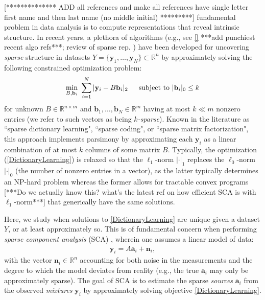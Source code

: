 \documentclass[journal, onecolumn]{IEEEtran}
\begin{document}
[************** ADD all references and make all references have single letter first name and then last name (no middle initial) *********]
 fundamental problem in data analysis is to compute representations that reveal intrinsic structure. In recent years, a plethora of algorithms (e.g., see \ref{} ***add punchiest recent algo refs***; review of sparse rep. \cite{Zhang15}) have been developed for uncovering \emph{sparse} structure in datasets $Y = \{\mathbf{y}_1, \ldots, \mathbf{y}_N\} \subset \mathbb{R}^n$ by approximately solving the following constrained optimization problem:
\begin{align}\label{DictionaryLearning}
\min_{B, \mathbf{b}_i} \  \sum_{i=1}^N |\mathbf{y}_i - B\mathbf{b}_i|_2 \indent \text{subject to } |\mathbf{b}_i|_0 \leq k
\end{align}
%
for unknown $B \in \mathbb{R}^{n \times m}$ and $\mathbf{b}_1, \ldots, \mathbf{b}_N \in \mathbb{R}^m$ having at most $k \ll m$ nonzero entries (we refer to such vectors as being \emph{$k$-sparse}). Known in the literature as ``sparse dictionary learning", ``sparse coding", or ``sparse matrix factorization", this approach implements parsimony by approximating each $\mathbf{y}_i$ as a linear combination of at most $k$ columns of some matrix $B$.  Typically, the optimization (\ref{DictionaryLearning}) is relaxed so that the $\ell_1$-norm $|\cdot|_1$ replaces the $\ell_0$-norm $|\cdot|_0$ (the number of nonzero entries in a vector), as the latter typically determines an NP-hard problem \cite{Tillmann15} whereas the former allows for tractable convex programs [***Do we actually know this?  what's the latest ref on how efficient SCA is with $\ell_1$-norm***] that generically have the same solutions.

Here, we study when solutions to \eqref{DictionaryLearning} are unique given a dataset $Y$, or at least approximately so. This is of fundamental concern when performing \emph{sparse component analysis} (SCA) \cite{Georgiev05}, wherein one assumes a linear model of data:
\begin{align}\label{LinearModel}
\mathbf{y}_i = A\mathbf{a}_i + \mathbf{n}_i,
\end{align}
with the vector $\mathbf{n}_i \in \mathbb{R}^n$ accounting for both noise in the measurements and the degree to which the model deviates from reality (e.g., the true $\mathbf{a}_i$ may only be approximately sparse). The goal of SCA is to estimate the sparse \emph{sources} $\mathbf{a}_i$ from the observed \emph{mixtures} $\mathbf{y}_i$ by approximately solving objective \eqref{DictionaryLearning}.
\end{document}

